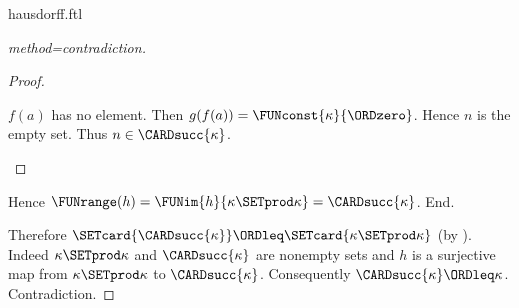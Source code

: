\documentclass{article}
\begin{document}
\begin{smodule}{hausdorff.ftl}
\begin{forthel}
\begin{proof}[method=contradiction]
\begin{proof}
        \begin{case}{$f(a)$ has no element.}
          Then $g(f(a)) = \FUNconst{\kappa}{\ORDzero}$.
          Hence $n$ is the empty set.
          Thus $n \in \CARDsucc{\kappa}$.
        \end{case}
      \end{proof}

      Hence $\FUNrange(h) = \FUNim{h}{\kappa \SETprod \kappa} = \CARDsucc{\kappa}$.
    End.

    Therefore $\SETcard{\CARDsucc{\kappa}} \ORDleq \SETcard{\kappa \SETprod \kappa}$ (by ).
    Indeed $\kappa \SETprod \kappa$ and $\CARDsucc{\kappa}$ are nonempty sets and $h$ is a surjective map from $\kappa \SETprod \kappa$ to $\CARDsucc{\kappa}$.
    Consequently $\CARDsucc{\kappa} \ORDleq \kappa$.
    Contradiction.
  \end{proof}
\end{forthel}

\printbibliography
\end{smodule}
\end{document}
